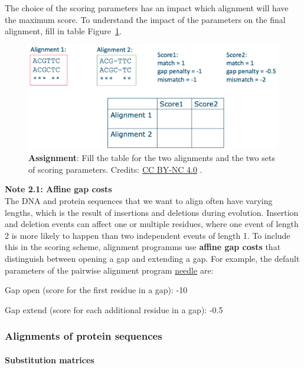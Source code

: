 The choice of the scoring parameters has an impact which alignment will have the maximum score.
To understand the impact of the parameters on the final alignment, fill in table Figure~\ref{algex}.

\begin{figure}[!htbp]
\centering
\includegraphics[width=1\linewidth]{files/alg_exercise-44d2e5d97743e3370181c88ae34956bf.png}
\caption[]{\textbf{Assignment}: Fill the table for the two alignments and the two sets of scoring parameters.
Credits: \href{https://creativecommons.org/licenses/by-nc/4.0/}{CC BY-NC 4.0} \cite{own_2_2024}.}
\label{algex}
\end{figure}

\begin{framed}
\textbf{Note 2.1: Affine gap costs}\\
The DNA and protein sequences that we want to align often have varying lengths, which is the result of insertions and deletions during evolution.
Insertion and deletion events can affect one or multiple residues, where one event of length 2 is more likely to happen than two independent events of length 1.
To include this in the scoring scheme, alignment programms use \textbf{affine gap costs} that distinguish between opening a gap and extending a gap.
For example, the default parameters of the pairwise alignment program \href{https://www.ebi.ac.uk/jdispatcher/psa/emboss\_needle}{needle} \cite{EMBL_tools_2022} are:

Gap open (score for the first residue in a gap): -10

Gap extend (score for each additional residue in a gap): -0.5
\end{framed}

\subsubsection{Alignments of protein sequences}

\paragraph{Substitution matrices}\label{chapter2_substitution_matrices}

